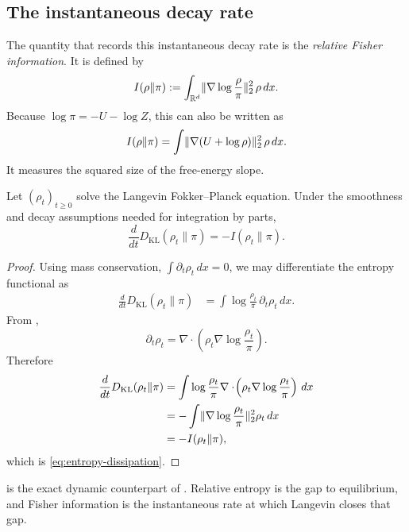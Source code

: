 \documentclass[11pt]{article}
\begin{document}
\subsection{The instantaneous decay rate}
\label{subsec:fisher-dissipation}

The quantity that records this instantaneous decay rate is the \emph{relative Fisher information}.
It is defined by
\begin{equation}
  I(\rho\|\pi)
  :=
  \int_{\mathbb{R}^d}
  \lVert\nabla\log\frac{\rho}{\pi}\rVert_2^2\,\rho\,dx.
  \label{eq:relative-fisher}
\end{equation}
Because $\log \pi=-U-\log Z$, this can also be written as
\[
I(\rho\|\pi)
=
\int \lVert\nabla(U+\log\rho)\rVert_2^2\,\rho\,dx.
\]
It measures the squared size of the free-energy slope.

\begin{proposition}
\label{prop:entropy-dissipation}
Let $(\rho_t)_{t\ge 0}$ solve the Langevin Fokker--Planck equation.
Under the smoothness and decay assumptions needed for integration by parts,
\begin{equation}
  \frac{d}{dt}D_{\mathrm{KL}}(\rho_t\|\pi)
  =
  -I(\rho_t\|\pi).
  \label{eq:entropy-dissipation}
\end{equation}
\end{proposition}

\begin{proof}
Using mass conservation, $\int \partial_t \rho_t\,dx=0$, we may differentiate the entropy functional as
\begin{align*}
  \frac{d}{dt}D_{\mathrm{KL}}(\rho_t\|\pi)
  &=
  \int \log\frac{\rho_t}{\pi}\,\partial_t \rho_t\,dx.
\end{align*}
From ,
\[
\partial_t \rho_t
=
\nabla\cdot\!\left(\rho_t\nabla\log\frac{\rho_t}{\pi}\right).
\]
Therefore
\begin{align*}
  \frac{d}{dt}D_{\mathrm{KL}}(\rho_t\|\pi)
  &=
  \int \log\frac{\rho_t}{\pi}
  \nabla\cdot\!\left(\rho_t\nabla\log\frac{\rho_t}{\pi}\right)\,dx \\
  &=
  -\int
  \lVert\nabla\log\frac{\rho_t}{\pi}\rVert_2^2
  \rho_t\,dx \\
  &=
  -I(\rho_t\|\pi),
\end{align*}
which is \eqref{eq:entropy-dissipation}.%
\end{proof}

 is the exact dynamic counterpart of .
Relative entropy is the gap to equilibrium, and Fisher information is the instantaneous rate at which Langevin closes that gap.
\end{document}
